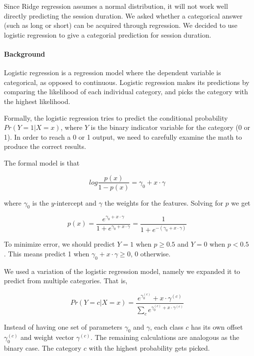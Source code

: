 \documentclass[]{article}
\begin{document}
Since Ridge regression assumes a normal distribution, it will not work well directly predicting the session duration. We asked whether a categorical answer (such as long or short) can be acquired through regression. We decided to use logistic regression to give a categorial prediction for session duration.

\paragraph{Background}

Logistic regression is a regression model where the dependent variable is categorical, as opposed to continuous. Logistic regression makes its predictions by comparing the likelihood of each individual category, and picks the category with the highest likelihood.

Formally, the logistic regression tries to predict the conditional probability $Pr(Y=1 | X= x)$, where $Y$ is the binary indicator variable for the category (0 or 1). In order to reach a 0 or 1 output, we need to carefully examine the math to produce the correct results.

The formal model \cite{cmulogisitc} is that

\begin{equation*}
log\frac{p(x)}{1-p(x)} = \gamma_0 + x\cdot \gamma
\end{equation*}

where $\gamma_0$ is the $y$-intercept and $\gamma$ the weights for the features. Solving for $p$ we get

\begin{equation*}
p(x) = \frac{e^{\gamma_0 + x \cdot \gamma}}{1 + e^{\gamma_0 + x \cdot \gamma}} = \frac{1}{1 + e^{-(\gamma_0 + x \cdot \gamma)}}
\end{equation*}

To minimize error, we should predict $Y=1$ when $p \geq 0.5$ and $Y=0$ when $p < 0.5$. This means predict 1 when $\gamma_0 + x \cdot \gamma \geq 0$, 0 otherwise.

We used a variation of the logistic regression model, namely we expanded it to predict from multiple categories. That is,

\begin{equation*}
Pr(Y=c | X = x) = \frac{e^{\gamma_0^{(c)}}+x\cdot \gamma^{(c)}}{\sum_c{e^{\gamma_0^{(c)} + x\cdot \gamma^{(c)}} }}
\end{equation*}

Instead of having one set of parameters $\gamma_0$ and $\gamma$, each class $c$ has its own offset $\gamma_0^{(c)}$ and weight vector $\gamma^{(c)}$. The remaining calculations are analogous as the binary case. The category $c$ with the highest probability gets picked.
\end{document}
